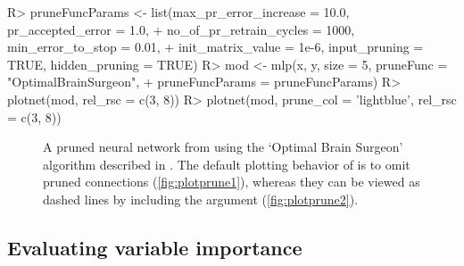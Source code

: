 \documentclass[article,shortnames]{jss}
\begin{document}
\begin{Schunk}
\begin{Sinput}
R> pruneFuncParams <- list(max_pr_error_increase = 10.0, pr_accepted_error = 1.0,
+   no_of_pr_retrain_cycles = 1000, min_error_to_stop = 0.01, 
+   init_matrix_value = 1e-6, input_pruning = TRUE, hidden_pruning = TRUE)
R> mod <- mlp(x, y, size = 5, pruneFunc = "OptimalBrainSurgeon",
+  pruneFuncParams = pruneFuncParams)
R> plotnet(mod, rel_rsc = c(3, 8))
R> plotnet(mod, prune_col = 'lightblue', rel_rsc = c(3, 8))
\end{Sinput}
\end{Schunk}
\begin{figure}[!ht]
\caption{A pruned neural network from  \citep{Bergmeir12} using the `Optimal Brain Surgeon' algorithm described in \citet{Zell98}.  The default plotting behavior of  is to omit pruned connections (\ref{fig:plotprune1}), whereas they can be viewed as dashed lines by including the  argument (\ref{fig:plotprune2}).}
\label{fig:plotprune}
\end{figure}

\subsection{Evaluating variable importance}
\end{document}
